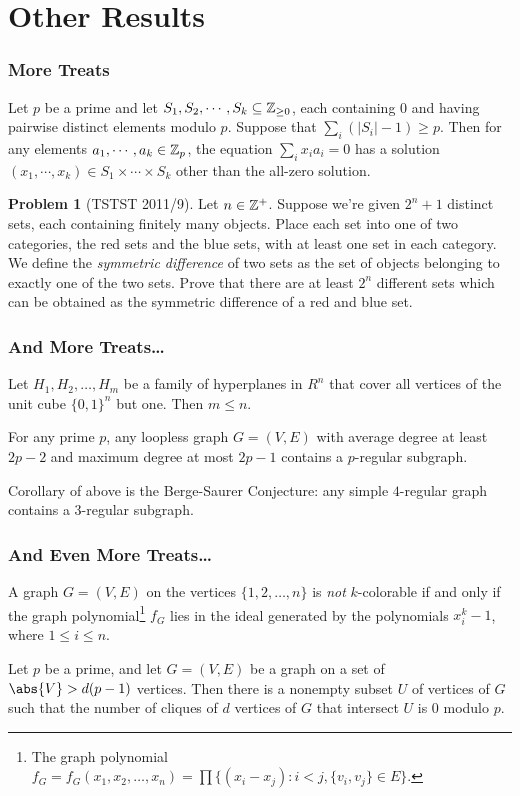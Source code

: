 \documentclass{beamer}
\theoremstyle{definition}
\newtheorem{problem*}{Problem}
\begin{document}
\section{Other Results}
\begin{frame}
  \frametitle{More Treats}
  \begin{theorem}
    Let $p$ be a prime and let $S_1,S_2,\cdots,S_k \subseteq \mathbb Z_{\ge 0}$, each containing $0$ and having pairwise distinct elements modulo $p$.  Suppose that $\sum_i(|S_i|-1) \ge p$.  Then for any elements $a_1,\cdots,a_k \in \mathbb Z_p$, the equation $\sum_i x_ia_i = 0$ has a solution $(x_1,\cdots,x_k) \in S_1 \times \cdots \times S_k$ other than the all-zero solution.
  \end{theorem}
  \begin{problem*}[TSTST 2011/9]
    Let $n \in \mathbb Z^+$.  Suppose we're given $2^n+1$ distinct sets, each containing finitely many objects.  Place each set into one of two categories, the red sets and the blue sets, with at least one set in each category.  We define the \textit{symmetric difference} of two sets as the set of objects belonging to exactly one of the two sets.  Prove that there are at least $2^n$ different sets which can be obtained as the symmetric difference of a red and blue set.
  \end{problem*}
\end{frame}

\begin{frame}
  \frametitle{And More Treats\dots}
  \begin{theorem}
    Let $H_1, H_2,\ldots, H_m$ be a family of hyperplanes in $R^n$ that cover all vertices of the unit cube $\{0,1\}^n$ but one. Then $m \leq n$.
  \end{theorem}
  \begin{theorem}[Alon]
    For any prime $p$, any loopless graph $G=(V,E)$ with average degree at least $2p-2$ and maximum degree at most $2p-1$ contains a $p$-regular subgraph.
  \end{theorem}
  Corollary of above is the \alert{Berge-Saurer Conjecture}: any simple $4$-regular graph contains a $3$-regular subgraph.
\end{frame}

\begin{frame}
  \frametitle{And Even More Treats\dots}
  \begin{theorem}[Alon]
    A graph $G=(V,E)$ on the vertices $\{1,2,\ldots,n\}$ is \emph{not} $k$-colorable if and only if the graph polynomial\footnote{The graph polynomial $f_G=f_G(x_1,x_2,\ldots,x_n)=\prod\{(x_i-x_j):i<j,\{v_i,v_j\}\in E\}$.} $f_G$ lies in the ideal generated by the polynomials $x_{i}^k-1$, where $1 \leq i \leq n$.
  \end{theorem}
  \begin{theorem}[Alon]
    Let $p$ be a prime, and let $G = (V, E)$ be a graph on a set of $\abs{V} > d(p-1)$ vertices.  Then there is a nonempty subset $U$ of vertices of $G$ such that the number of cliques of $d$ vertices of $G$ that intersect $U$ is $0$ modulo $p$.
  \end{theorem}
\end{frame}
\end{document}
